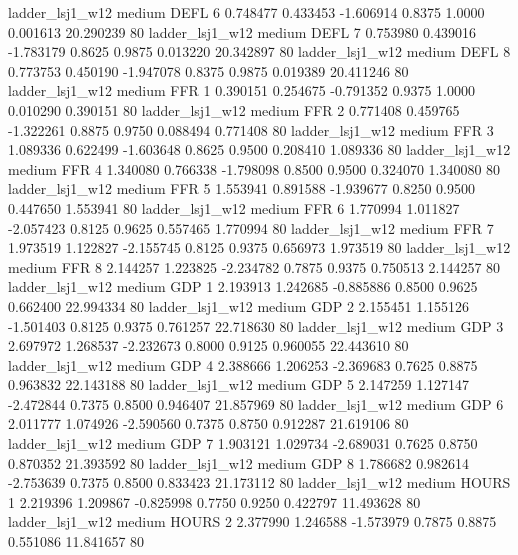        ladder_lsj1_w12     medium     DEFL                 6  0.748477 0.433453 -1.606914 0.8375 1.0000  0.001613   20.290239 80
       ladder_lsj1_w12     medium     DEFL                 7  0.753980 0.439016 -1.783179 0.8625 0.9875  0.013220   20.342897 80
       ladder_lsj1_w12     medium     DEFL                 8  0.773753 0.450190 -1.947078 0.8375 0.9875  0.019389   20.411246 80
       ladder_lsj1_w12     medium      FFR                 1  0.390151 0.254675 -0.791352 0.9375 1.0000  0.010290    0.390151 80
       ladder_lsj1_w12     medium      FFR                 2  0.771408 0.459765 -1.322261 0.8875 0.9750  0.088494    0.771408 80
       ladder_lsj1_w12     medium      FFR                 3  1.089336 0.622499 -1.603648 0.8625 0.9500  0.208410    1.089336 80
       ladder_lsj1_w12     medium      FFR                 4  1.340080 0.766338 -1.798098 0.8500 0.9500  0.324070    1.340080 80
       ladder_lsj1_w12     medium      FFR                 5  1.553941 0.891588 -1.939677 0.8250 0.9500  0.447650    1.553941 80
       ladder_lsj1_w12     medium      FFR                 6  1.770994 1.011827 -2.057423 0.8125 0.9625  0.557465    1.770994 80
       ladder_lsj1_w12     medium      FFR                 7  1.973519 1.122827 -2.155745 0.8125 0.9375  0.656973    1.973519 80
       ladder_lsj1_w12     medium      FFR                 8  2.144257 1.223825 -2.234782 0.7875 0.9375  0.750513    2.144257 80
       ladder_lsj1_w12     medium      GDP                 1  2.193913 1.242685 -0.885886 0.8500 0.9625  0.662400   22.994334 80
       ladder_lsj1_w12     medium      GDP                 2  2.155451 1.155126 -1.501403 0.8125 0.9375  0.761257   22.718630 80
       ladder_lsj1_w12     medium      GDP                 3  2.697972 1.268537 -2.232673 0.8000 0.9125  0.960055   22.443610 80
       ladder_lsj1_w12     medium      GDP                 4  2.388666 1.206253 -2.369683 0.7625 0.8875  0.963832   22.143188 80
       ladder_lsj1_w12     medium      GDP                 5  2.147259 1.127147 -2.472844 0.7375 0.8500  0.946407   21.857969 80
       ladder_lsj1_w12     medium      GDP                 6  2.011777 1.074926 -2.590560 0.7375 0.8750  0.912287   21.619106 80
       ladder_lsj1_w12     medium      GDP                 7  1.903121 1.029734 -2.689031 0.7625 0.8750  0.870352   21.393592 80
       ladder_lsj1_w12     medium      GDP                 8  1.786682 0.982614 -2.753639 0.7375 0.8500  0.833423   21.173112 80
       ladder_lsj1_w12     medium    HOURS                 1  2.219396 1.209867 -0.825998 0.7750 0.9250  0.422797   11.493628 80
       ladder_lsj1_w12     medium    HOURS                 2  2.377990 1.246588 -1.573979 0.7875 0.8875  0.551086   11.841657 80
